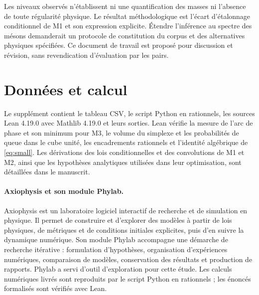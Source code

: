 \documentclass[11pt,a4paper]{article}
\begin{document}
Les niveaux observés n'établissent ni une quantification des masses ni l'absence de toute régularité physique. Le résultat méthodologique est l'écart d'étalonnage conditionnel de M1 et son expression explicite. Étendre l'inférence au spectre des mésons demanderait un protocole de constitution du corpus et des alternatives physiques spécifiées. Ce document de travail est proposé pour discussion et révision, sans revendication d'évaluation par les pairs.

\section*{Données et calcul}

Le supplément contient le tableau CSV, le script Python en rationnels, les sources Lean 4.19.0 avec Mathlib 4.19.0 et leurs sorties. Lean vérifie la mesure de l'arc de phase et son minimum pour M3, le volume du simplexe et les probabilités de queue dans le cube unité, les encadrements rationnels et l'identité algébrique de \eqref{eq:small}. Les dérivations des lois conditionnelles et des convolutions de M1 et M2, ainsi que les hypothèses analytiques utilisées dans leur optimisation, sont détaillées dans le manuscrit.

\paragraph{Axiophysis et son module Phylab.}
Axiophysis est un laboratoire logiciel interactif de recherche et de simulation en physique. Il permet de construire et d'explorer des modèles à partir de lois physiques, de métriques et de conditions initiales explicites, puis d'en suivre la dynamique numérique. Son module Phylab accompagne une démarche de recherche itérative : formulation d'hypothèses, organisation d'expériences numériques, comparaison de modèles, conservation des résultats et production de rapports. Phylab a servi d'outil d'exploration pour cette étude. Les calculs numériques livrés sont reproduits par le script Python en rationnels ; les énoncés formalisés sont vérifiés avec Lean.
\end{document}
